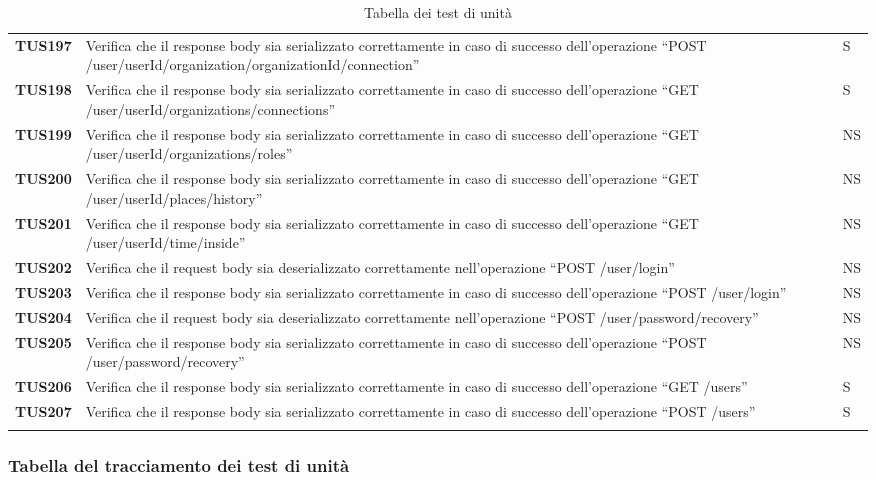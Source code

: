 \documentclass[../../piano-di-qualifica.tex]{subfiles}
\begin{document}
\begin{longtable}[H]{>{\centering\bfseries}m{3cm} >{}m{10cm} >{\centering\arraybackslash}m{3cm}}
  TUS197 & Verifica che il response body sia serializzato correttamente in caso di successo dell'operazione ``POST /user/{userId}/organization/{organizationId}/connection'' & S \\
  TUS198 & Verifica che il response body sia serializzato correttamente in caso di successo dell'operazione ``GET /user/{userId}/organizations/connections'' & S \\
  TUS199 & Verifica che il response body sia serializzato correttamente in caso di successo dell'operazione ``GET /user/{userId}/organizations/roles'' & NS \\
  TUS200 & Verifica che il response body sia serializzato correttamente in caso di successo dell'operazione ``GET /user/{userId}/places/history'' & NS \\
  TUS201 & Verifica che il response body sia serializzato correttamente in caso di successo dell'operazione ``GET /user/{userId}/time/inside'' & NS \\
  TUS202 & Verifica che il request body sia deserializzato correttamente nell'operazione ``POST /user/login'' & NS \\
  TUS203 & Verifica che il response body sia serializzato correttamente in caso di successo dell'operazione ``POST /user/login'' & NS \\
  TUS204 & Verifica che il request body sia deserializzato correttamente nell'operazione ``POST /user/password/recovery'' & NS \\
  TUS205 & Verifica che il response body sia serializzato correttamente in caso di successo dell'operazione ``POST /user/password/recovery'' & NS \\
  TUS206 & Verifica che il response body sia serializzato correttamente in caso di successo dell'operazione ``GET /users'' & S \\
  TUS207 & Verifica che il response body sia serializzato correttamente in caso di successo dell'operazione ``POST /users'' & S \\
  \rowcolor{white}
  \caption{Tabella dei test di unità}%
  \label{tab:test_di_unita}
\end{longtable}


\subsubsection{Tabella del tracciamento dei test di unità}%
\label{subsub:tabella_tracciamento_test_di_unita}
\end{document}
